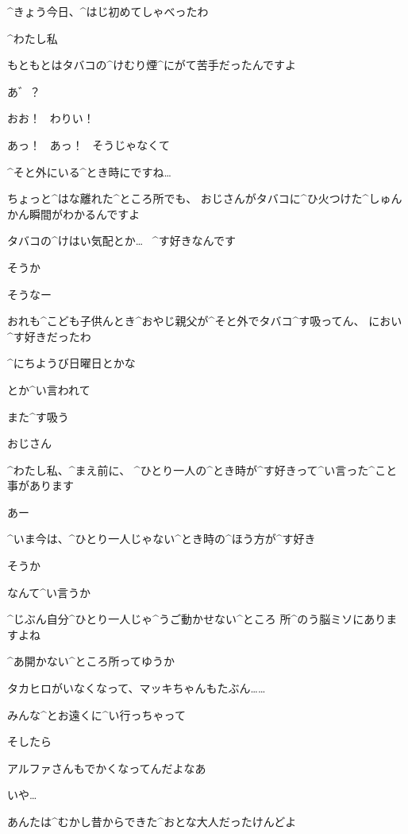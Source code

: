 \Ojisan ^{きょう}{今日}、^{はじ}{初}めてしゃべったわ

\page[153]
\Alpha ^{わたし}{私}

\Alpha もともとはタバコの^{けむり}{煙}^{にがて}{苦手}だったんですよ

\Ojisan あ゛？

\Ojisan おお！
\ わりい！

\Alpha あっ！
\ あっ！
\ そうじゃなくて

\Alpha ^{そと}{外}にいる^{とき}{時}にですね…

\Alpha ちょっと^{はな}{離}れた^{ところ}{所}でも、
おじさんがタバコに^{ひ}{火}つけた^{しゅんかん}{瞬間}がわかるんですよ

\Alpha タバコの^{けはい}{気配}とか…
\ ^{す}{好}きなんです

\page[154]
\Ojisan そうか

\Ojisan そうなー

\Ojisan おれも^{こども}{子供}んとき^{おやじ}{親父}が^{そと}{外}でタバコ^{す}{吸}ってん、
におい^{す}{好}きだったわ

\Ojisan ^{にちようび}{日曜日}とかな

\page[155]
\Ojisan とか^{い}{言}われて

\Ojisan また^{す}{吸}う

\Alpha おじさん

\Alpha ^{わたし}{私}、^{まえ}{前}に、
^{ひとり}{一人}の^{とき}{時}が^{す}{好}きって^{い}{言}った^{こと}{事}があります

\Ojisan あー

\Alpha ^{いま}{今}は、^{ひとり}{一人}じゃない^{とき}{時}の^{ほう}{方}が^{す}{好}き

\page[156]
\Ojisan そうか

\Alpha なんて^{い}{言}うか

\Alpha ^{じぶん}{自分}^{ひとり}{一人}じゃ^{うご}{動}かせない^{ところ }{所}^{のう}{脳}ミソにありますよね

\Alpha ^{あ}{開}かない^{ところ}{所}ってゆうか

\Alpha タカヒロがいなくなって、マッキちゃんもたぶん……

\Alpha みんな^{とお}{遠}くに^{い}{行}っちゃって

\page[157]
\Alpha そしたら

\Ojisan アルファさんもでかくなってんだよなあ

\page[158]
\Ojisan いや…

\Ojisan あんたは^{むかし}{昔}からできた^{おとな}{大人}だったけんどよ

